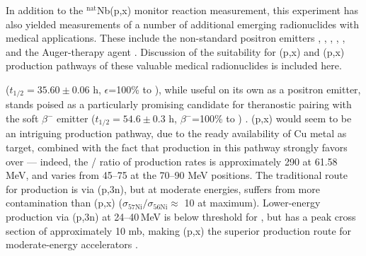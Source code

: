 In addition to the $^\text{nat}$Nb(p,x) monitor reaction measurement, this experiment has also yielded measurements of  a number of additional  emerging radionuclides with medical applications.
These include the non-standard positron emitters 
 \cite{PMID:7632762,zweit1996medium,Graves2016,Rosch2014}, 
 \cite{Lewis2003,Bandari2014,mp500671j,Szelecsenyi1993,Aslam2009,Hilgers2003,Szelecsenyi2005,Voyles2017},   \cite{Valdovinos2017,Nickles2003,Qaim2008,QaimSyedM2011,Rosch1993,doi:10.1139/v67-193,levkovski1991cross,Johnson2015,Singh2013,Kiselev1974,Kandil2009}, 
  \cite{Verel2003,Dijkers2009,Dijkers2010,PhysRevC.38.1624,Omara2009},  
 \cite{Busse2002,Radchenko2012},  
and the Auger-therapy agent  \cite{Kovacs1991,Titarenko2011}. 
Discussion of the suitability for  (p,x) and (p,x) production pathways of these valuable medical radionuclides is included here. 


%
%

 ($t_{1/2}=35.60\pm0.06$ h, $\epsilon$=100\% to  \cite{Bhat1998}), while useful on its own as a positron emitter, stands poised as a particularly promising candidate for theranostic pairing with the soft $\beta^-$ emitter  ($t_{1/2}=54.6\pm0.3$ h, $\beta^-$=100\% to  \cite{Browne2010a}) \cite{PMID:7632762,zweit1996medium,Graves2016,Rosch2014}. 
(p,x) would seem to be an intriguing production pathway, due to the ready availability of Cu metal as target, combined with the fact that production in this pathway strongly favors  over  --- indeed, the / 
ratio of production rates is approximately 290 at 61.58 MeV, and varies from 45--75 at the 70--90 MeV positions.
The traditional route for  production is via (p,3n), but at moderate energies, suffers from more   contamination than (p,x)  ($\sigma_\text{57Ni} / \sigma_\text{56Ni}\approx$ 10 at maximum).
Lower-energy production via (p,3n) at 24--40\,MeV is below threshold for , but has a peak cross section of approximately 10 mb, making (p,x) the superior production route for moderate-energy accelerators  \cite{MICHEL1997153,Ditrói2013}.


